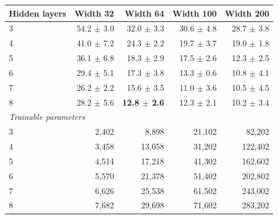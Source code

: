 \begin{tabular}{lrrrr}
\toprule
\textbf{Hidden layers} & \textbf{Width 32} & \textbf{Width 64} & \textbf{Width 100} & \textbf{Width 200} \\
\midrule
3 & 54.2 $\pm$ 3.0 & 32.0 $\pm$ 3.3 & 30.6 $\pm$ 4.8 & 28.7 $\pm$ 3.8 \\
4 & 41.0 $\pm$ 7.2 & 24.3 $\pm$ 2.2 & 19.7 $\pm$ 3.7 & 19.0 $\pm$ 1.8 \\
5 & 36.1 $\pm$ 6.8 & 18.3 $\pm$ 2.9 & 17.5 $\pm$ 2.6 & 12.3 $\pm$ 2.5 \\
6 & 29.4 $\pm$ 5.1 & 17.3 $\pm$ 3.8 & 13.3 $\pm$ 0.6 & 10.8 $\pm$ 4.1 \\
7 & 26.2 $\pm$ 2.2 & 15.6 $\pm$ 3.5 & 11.0 $\pm$ 3.6 & 10.5 $\pm$ 4.5 \\
8 & 28.2 $\pm$ 5.6 & \textbf{12.8 $\pm$ 2.6} & 12.3 $\pm$ 2.1 & 10.2 $\pm$ 3.4 \\
\midrule
\multicolumn{5}{l}{\textit{Trainable parameters}} \\
3 & 2{,}402 & 8{,}898 & 21{,}102 & 82{,}202 \\
4 & 3{,}458 & 13{,}058 & 31{,}202 & 122{,}402 \\
5 & 4{,}514 & 17{,}218 & 41{,}302 & 162{,}602 \\
6 & 5{,}570 & 21{,}378 & 51{,}402 & 202{,}802 \\
7 & 6{,}626 & 25{,}538 & 61{,}502 & 243{,}002 \\
8 & 7{,}682 & 29{,}698 & 71{,}602 & 283{,}202 \\
\bottomrule
\end{tabular}
